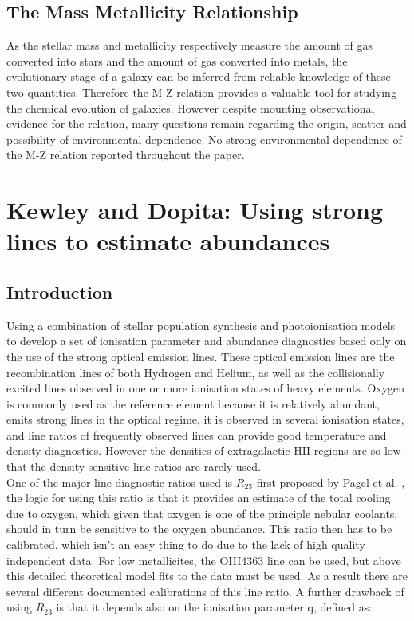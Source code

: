 \documentclass{literature}
\begin{document}
\subsection{The Mass Metallicity Relationship}
As the stellar mass and metallicity respectively measure the amount of gas converted into stars and the amount of gas converted into metals, the evolutionary stage of a galaxy can be inferred from reliable knowledge of these two quantities. Therefore the M-Z relation provides a valuable tool for studying the chemical evolution of galaxies. However despite mounting observational evidence for the relation, many questions remain regarding the origin, scatter and possibility of environmental dependence. No strong environmental dependence of the M-Z relation reported throughout the paper.







\section{Kewley and Dopita: Using strong lines to estimate abundances}\label{sec:Kewley_Dopita}
\subsection{Introduction}
Using a combination of stellar population synthesis and photoionisation models to develop a set of ionisation parameter and abundance diagnostics based only on the use of the strong optical emission lines. These optical emission lines are the recombination lines of both Hydrogen and Helium, as well as the collisionally excited lines observed in one or more ionisation states of heavy elements. Oxygen is commonly used as the reference element because it is relatively abundant, emits strong lines in the optical regime, it is observed in several ionisation states, and line ratios of frequently observed lines can provide good temperature and density diagnostics. However the densities of extragalactic HII regions are so low that the density sensitive line ratios are rarely used.  \\ 
One of the major line diagnostic ratios used is $R_{23}$ first proposed by Pagel et al. \citep{Pagel_1979}, the logic for using this ratio is that it provides an estimate of the total cooling due to oxygen, which given that oxygen is one of the principle nebular coolants, should in turn be sensitive to the oxygen abundance. This ratio then has to be calibrated, which isn't an easy thing to do due to the lack of high quality independent data. For low metallicites, the OIII4363 line can be used, but above this detailed theoretical model fits to the data must be used. As a result there are several different documented calibrations of this line ratio. A further drawback of using $R_{23}$ is that it depends also on the ionisation parameter q, defined as: 
\end{document}
